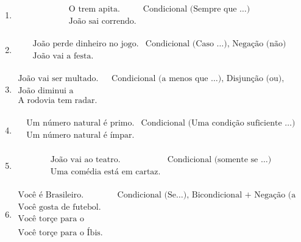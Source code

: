 \begin{enumerate}
\begin{enumerate}
				 \item
   				 \[\begin{array}{ll}    
  				 \text{O trem apita.} & \text{Condicional (Sempre que \ldots) } \\
  				 \text{Jo\~ao sai correndo.} & \\
  				 \end{array}
  				 \]
				 
				 \item
    			 \[\begin{array}{ll}    
   				 \text{Jo\~ao perde dinheiro no jogo.} & \text{Condicional (Caso \ldots), Nega\c{c}\~ao (n\~ao) } \\
   				 \text{Jo\~ao vai a festa.} & \\
   				 \end{array}
   				 \]
				  
				 \item
     			 \[\begin{array}{ll}    
  				 \text{Jo\~ao vai ser multado.} & \text{Condicional (a menos que \ldots), Disjun\c{c}\~ao (ou), Nega\c{c}\~ao (n\~ao) } \\
  				 \text{Jo\~ao diminui a velocidade.} & \\
  				 \text{A rodovia tem radar.} & \\
  				 \end{array}
  				 \]
				 				  
				\item
   			    \[\begin{array}{ll}    
				\text{Um n\'umero natural \'e primo.} & \text{Condicional (Uma condi\c{c}\~ao suficiente \ldots)} \\
				\text{Um n\'umero natural \'e \'impar.} & \\
				\end{array}
				\]
				 
				\item
			    \[\begin{array}{ll}    
				\text{Jo\~ao vai ao teatro.} & \text{Condicional (somente se \ldots)} \\
				\text{Uma com\'edia est\'a em cartaz.} & \\
				\end{array}
				\]
				  
				\item
			    \[\begin{array}{ll}    
				\text{Voc\^e \'e Brasileiro.} & \text{Condicional   (Se\ldots), Bicondicional + Nega\c{c}\~ao (a menos \ldots)} \\
				\text{Voc\^e gosta de futebol.} & \\
				\text{Voc\^e tor\c{c}e para o Tabajara.} & \\
				\text{Voc\^e tor\c{c}e para o \'Ibis.} & \\
				\end{array}
				\]  
				

\end{enumerate}
\end{enumerate}
